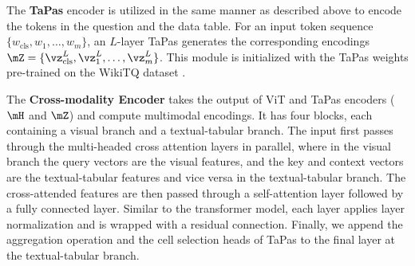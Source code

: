 The \textbf{TaPas} encoder is utilized in the same manner as described above to encode the tokens in the question and the data table. For an input token sequence $\{w_{\text{cls}},  w_1, \ldots, w_m\}$, an $L$-layer TaPas generates the corresponding encodings $\mZ = \{\vz_{\text{cls}}^L, \vz_1^L, \ldots, \vz_m^L\}$. This module is initialized with the TaPas weights \cite{tapas} pre-trained on the WikiTQ dataset \cite{sempre}. 

The \textbf{Cross-modality Encoder} 
takes the output of ViT and TaPas encoders ($\mH$ and $\mZ$) and compute multimodal encodings. It has four blocks, each containing 
a visual branch and a textual-tabular branch. The input first passes through the multi-headed cross attention layers in parallel, where in the visual branch the query vectors are the visual features, and the key and context vectors are the textual-tabular features and vice versa in the textual-tabular branch. The cross-attended features are then passed through a self-attention layer followed by a fully connected layer. Similar to the transformer model, each layer applies layer normalization \cite{LayerN} and is wrapped with a residual connection. Finally, we append the aggregation operation and the cell selection heads of TaPas to the final layer at the textual-tabular branch.     




